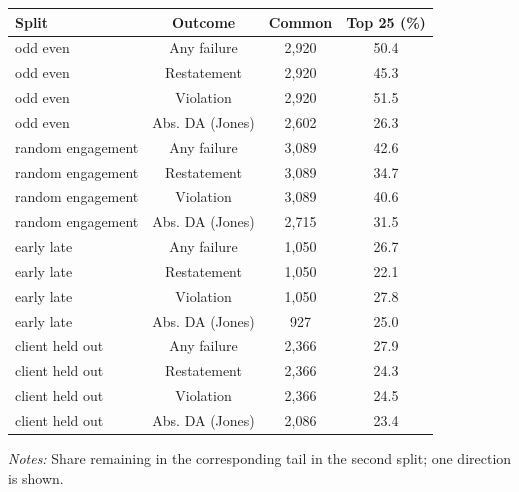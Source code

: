 \documentclass[10pt]{article}
\begin{document}
\begin{minipage}{19cm}\fontsize{10}{12}\selectfont\setlength{\tabcolsep}{4pt}\renewcommand{\arraystretch}{1.12}


\centering
{}
\begin{threeparttable}
\begin{tabular}{p{}ccc}
\toprule
Split & Outcome & Common & Top 25 (\%) \\
\midrule
odd even & Any failure & 2,920 & 50.4 \\
odd even & Restatement & 2,920 & 45.3 \\
odd even & Violation & 2,920 & 51.5 \\
odd even & Abs. DA (Jones) & 2,602 & 26.3 \\
random engagement & Any failure & 3,089 & 42.6 \\
random engagement & Restatement & 3,089 & 34.7 \\
random engagement & Violation & 3,089 & 40.6 \\
random engagement & Abs. DA (Jones) & 2,715 & 31.5 \\
early late & Any failure & 1,050 & 26.7 \\
early late & Restatement & 1,050 & 22.1 \\
early late & Violation & 1,050 & 27.8 \\
early late & Abs. DA (Jones) & 927 & 25.0 \\
client held out & Any failure & 2,366 & 27.9 \\
client held out & Restatement & 2,366 & 24.3 \\
client held out & Violation & 2,366 & 24.5 \\
client held out & Abs. DA (Jones) & 2,086 & 23.4 \\
\bottomrule
\end{tabular}
\begin{tablenotes}\fontsize{9}{11}\selectfont
\item \raggedright \fontsize{9}{11}\selectfont \textit{Notes:} Share remaining in the corresponding tail in the second split; one direction is shown.
\end{tablenotes}
\end{threeparttable}

\end{minipage}
\end{document}
